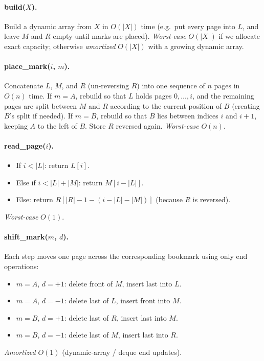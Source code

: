 \documentclass[12pt,twoside]{article}
\begin{document}
\begin{problems}
\paragraph{build($X$).}
Build a dynamic array from $X$ in $O(|X|)$ time (e.g.\ put every page into $L$, and leave $M$ and $R$ empty until marks are placed).
{\em Worst-case} $O(|X|)$ if we allocate exact capacity; otherwise {\em amortized} $O(|X|)$ with a growing dynamic array.

\paragraph{place\_mark($i$, $m$).}
Concatenate $L$, $M$, and $R$ (un-reversing $R$) into one sequence of $n$ pages in $O(n)$ time.
If $m = A$, rebuild so that $L$ holds pages $0,\ldots,i$, and the remaining pages are split between $M$ and $R$ according to the current position of $B$ (creating $B$'s split if needed).
If $m = B$, rebuild so that $B$ lies between indices $i$ and $i+1$, keeping $A$ to the left of $B$.
Store $R$ reversed again.
{\em Worst-case} $O(n)$.

\paragraph{read\_page($i$).}
\begin{itemize}
    \item If $i < |L|$: return $L[i]$.
    \item Else if $i < |L|+|M|$: return $M[i-|L|]$.
    \item Else: return $R[|R|-1-(i-|L|-|M|)]$ (because $R$ is reversed).
\end{itemize}
{\em Worst-case} $O(1)$.

\paragraph{shift\_mark($m$, $d$).}
Each step moves one page across the corresponding bookmark using only end operations:
\begin{itemize}
    \item $m=A$, $d=+1$: delete front of $M$, insert last into $L$.
    \item $m=A$, $d=-1$: delete last of $L$, insert front into $M$.
    \item $m=B$, $d=+1$: delete last of $R$, insert last into $M$.
    \item $m=B$, $d=-1$: delete last of $M$, insert last into $R$.
\end{itemize}
{\em Amortized} $O(1)$ (dynamic-array / deque end updates).


\end{problems}
\end{document}
